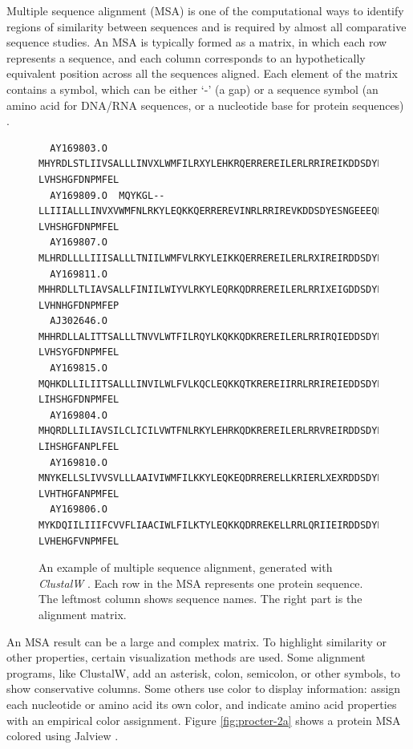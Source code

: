 Multiple sequence alignment (MSA) is one of the computational ways to identify regions of similarity between sequences and is required by almost all comparative sequence studies. An MSA is typically formed as a matrix, in which each row represents a sequence, and each column corresponds to an hypothetically equivalent position across all the sequences aligned. Each element of the matrix contains a symbol, which can be either `-' (a gap) or a sequence symbol (an amino acid for DNA/RNA sequences, or a nucleotide base for protein sequences) \cite{Edgar:2006aa}.

\begin{figure}[hb]
\scriptsize
\begin{verbatim}
  AY169803.O  MHYRDLSTLIIVSALLLINVXLWMFILRXYLEHKRQERREREILERLRRIREIKDDSDYESNGEEEQEVMD-LVHSHGFDNPMFEL
  AY169809.O  MQYKGL--LLIIIALLLINVXVWMFNLRKYLEQKKQERREREVINRLRRIREVKDDSDYESNGEEEQEVME-LVHSHGFDNPMFEL
  AY169807.O  MLHRDLLLLIIISALLLTNIILWMFVLRKYLEIKKQERREREILERLRXIREIRDDSDYESNEEEEQEVRDHLVHTFGFANPMFEI
  AY169811.O  MHHRDLLTLIAVSALLFINIILWIYVLRKYLEQRKQDRREREILERLRRIXEIGDDSDYESNEEEEQEVMD-LVHNHGFDNPMFEP
  AJ302646.O  MHHRDLLALITTSALLLTNVVLWTFILRQYLKQKKQDKREREILERLRRIRQIEDDSDYESDGTEEQEVRD-LVHSYGFDNPMFEL
  AY169815.O  MQHKDLLILIITSALLLINVILWLFVLKQCLEQKKQTKREREIIRRLRRIREIEDDSDYESNGEEEQTVRD-LIHSHGFDNPMFEL
  AY169804.O  MHQRDLLILIAVSILCLICILVWTFNLRKYLEHRKQDKREREILERLRRVREIRDDSDYESBGEEEQEVMD-LIHSHGFANPLFEL
  AY169810.O  MNYKELLSLIVVSVLLLAAIVIWMFILKKYLEQKEQDRRERELLKRIERLXEXRDDSDYESNGDEEQEVMH-LVHTHGFANPMFEL
  AY169806.O  MYKDQIILIIIFCVVFLIAACIWLFILKTYLEQKKQDRREKELLRRLQRIIEIRDDSDYESNGEEEQEVMD-LVHEHGFVNPMFEL
\end{verbatim}
\caption[Example of Multiple Sequence Alignment]{An example of multiple sequence alignment, generated with \emph{ClustalW} \cite{Thompsonaa}. Each row in the MSA represents one protein sequence. The leftmost column shows sequence names. The right part is the alignment matrix. }\label{fig:msa}
\end{figure}

An MSA result can be a large and complex matrix. To highlight similarity or other properties, certain visualization methods are used. Some alignment programs, like ClustalW, add an asterisk, colon, semicolon, or other symbols, to show conservative columns. Some others use color to display information: assign each nucleotide or amino acid its own color, and indicate amino acid properties with an empirical color assignment. Figure \ref{fig:procter-2a} shows a protein MSA colored using Jalview \cite{Waterhouse:2009fk}.

